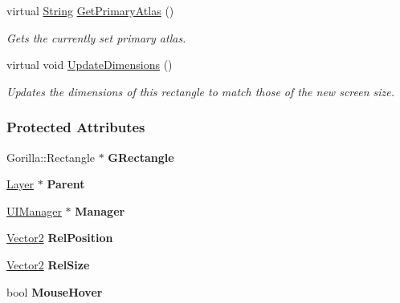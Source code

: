 \begin{DoxyCompactItemize}
virtual \hyperlink{namespacephys_aa03900411993de7fbfec4789bc1d392e}{String} \hyperlink{classphys_1_1UI_1_1Rectangle_ab4fe2f73e386c9735ad17789ce6cc51a}{GetPrimaryAtlas} ()
\begin{DoxyCompactList}\small\item\em Gets the currently set primary atlas. \item\end{DoxyCompactList}\item 
virtual void \hyperlink{classphys_1_1UI_1_1Rectangle_a090cfa5a1298c333335258d52d81c017}{UpdateDimensions} ()
\begin{DoxyCompactList}\small\item\em Updates the dimensions of this rectangle to match those of the new screen size. \item\end{DoxyCompactList}\end{DoxyCompactItemize}
\subsubsection*{Protected Attributes}
\begin{DoxyCompactItemize}
\item 
\hypertarget{classphys_1_1UI_1_1Rectangle_a2646b0bcc1602757852c21fd70e169cc}{
Gorilla::Rectangle $\ast$ {\bfseries GRectangle}}
\label{d1/d5d/classphys_1_1UI_1_1Rectangle_a2646b0bcc1602757852c21fd70e169cc}

\item 
\hypertarget{classphys_1_1UI_1_1Rectangle_ac54c65c81e321d6ba3c58f32af71d407}{
\hyperlink{classphys_1_1UI_1_1Layer}{Layer} $\ast$ {\bfseries Parent}}
\label{d1/d5d/classphys_1_1UI_1_1Rectangle_ac54c65c81e321d6ba3c58f32af71d407}

\item 
\hypertarget{classphys_1_1UI_1_1Rectangle_a3c78c2e48573d00290f3374e53971a4c}{
\hyperlink{classphys_1_1UIManager}{UIManager} $\ast$ {\bfseries Manager}}
\label{d1/d5d/classphys_1_1UI_1_1Rectangle_a3c78c2e48573d00290f3374e53971a4c}

\item 
\hypertarget{classphys_1_1UI_1_1Rectangle_ae059b550f2d6c490f769bcab07b37910}{
\hyperlink{classphys_1_1Vector2}{Vector2} {\bfseries RelPosition}}
\label{d1/d5d/classphys_1_1UI_1_1Rectangle_ae059b550f2d6c490f769bcab07b37910}

\item 
\hypertarget{classphys_1_1UI_1_1Rectangle_acac4d6cf1b71363d9c27f900b215667e}{
\hyperlink{classphys_1_1Vector2}{Vector2} {\bfseries RelSize}}
\label{d1/d5d/classphys_1_1UI_1_1Rectangle_acac4d6cf1b71363d9c27f900b215667e}

\item 
\hypertarget{classphys_1_1UI_1_1Rectangle_a98b63e58485ebb065c1ad62dc39ac63b}{
bool {\bfseries MouseHover}}
\label{d1/d5d/classphys_1_1UI_1_1Rectangle_a98b63e58485ebb065c1ad62dc39ac63b}

\end{DoxyCompactItemize}


